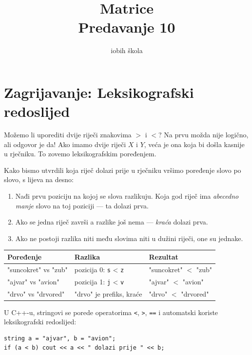 \documentclass[11pt]{article}
\title{\textbf{Matrice}\\[4pt]\large Predavanje 10}
\author{iobih škola}
\date{}
\begin{document}
\maketitle
\thispagestyle{fancy}

\section*{Zagrijavanje: Leksikografski redoslijed}

Možemo li uporediti dvije riječi znakovima $>$ i $<$? Na prvu možda nije
logično, ali odgovor je da! Ako imamo dvije riječi $X$ i $Y$, veća je ona koja
bi došla kasnije u rječniku. To zovemo leksikografskim poređenjem.

Kako bismo utvrdili koja riječ dolazi prije u rječniku vršimo poređenje slovo po slovo, s lijeva na desno:

\begin{enumerate}
    \item Nađi prvu poziciju na kojoj se slova razlikuju.
          Koja god riječ ima \emph{abecedno manje} slovo na toj poziciji — ta dolazi prva.
    \item Ako se jedna riječ završi a razlike još nema — \emph{kraća} dolazi prva.
    \item Ako ne postoji razlika niti među slovima niti u dužini riječi, one su jednake.
\end{enumerate}

\begin{center}
\begin{tabular}{@{} >{\ttfamily}l l l @{}}
    \toprule
    \textbf{Poređenje} & \textbf{Razlika} & \textbf{Rezultat} \\
    \midrule
    "suncokret" vs "zub" & pozicija 0: \texttt{s} < \texttt{z} & "suncokret" $<$ "zub" \\
    "ajvar" vs "avion"  & pozicija 1: \texttt{j} < \texttt{v} & "ajvar" $<$ "avion" \\
    "drvo"  vs "drvored" & "drvo" je prefiks, kraće & "drvo" $<$ "drvored" \\
    \bottomrule
\end{tabular}
\end{center}

\smallskip
U C++-u, stringovi se porede operatorima \texttt{<}, \texttt{>}, \texttt{==}
i automatski koriste leksikografski redoslijed:

\begin{lstlisting}
string a = "ajvar", b = "avion";
if (a < b) cout << a << " dolazi prije " << b;
\end{lstlisting}
\end{document}
